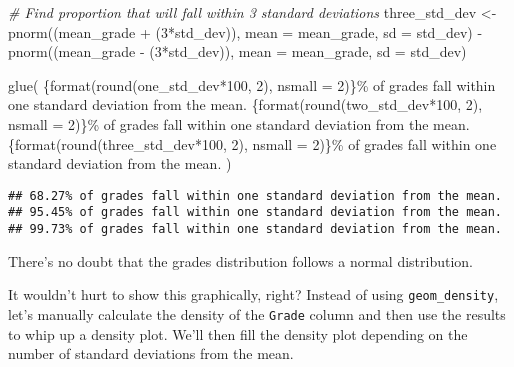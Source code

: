 \documentclass[
]{article}
\newenvironment{Shaded}{\begin{snugshade}}{\end{snugshade}}
\newcommand{\AttributeTok}[1]{\textcolor[rgb]{0.77,0.63,0.00}{#1}}
\newcommand{\CommentTok}[1]{\textcolor[rgb]{0.56,0.35,0.01}{\textit{#1}}}
\newcommand{\DecValTok}[1]{\textcolor[rgb]{0.00,0.00,0.81}{#1}}
\newcommand{\FunctionTok}[1]{\textcolor[rgb]{0.00,0.00,0.00}{#1}}
\newcommand{\NormalTok}[1]{#1}
\newcommand{\OtherTok}[1]{\textcolor[rgb]{0.56,0.35,0.01}{#1}}
\newcommand{\SpecialCharTok}[1]{\textcolor[rgb]{0.00,0.00,0.00}{#1}}
\newcommand{\StringTok}[1]{\textcolor[rgb]{0.31,0.60,0.02}{#1}}
\begin{document}
\begin{Shaded}
\begin{Highlighting}[]
\CommentTok{\# Find proportion that will fall within 3 standard deviations}
\NormalTok{three\_std\_dev }\OtherTok{\textless{}{-}} \FunctionTok{pnorm}\NormalTok{((mean\_grade }\SpecialCharTok{+}\NormalTok{ (}\DecValTok{3}\SpecialCharTok{*}\NormalTok{std\_dev)), }\AttributeTok{mean =}\NormalTok{ mean\_grade, }\AttributeTok{sd =}\NormalTok{ std\_dev) }\SpecialCharTok{{-}} 
  \FunctionTok{pnorm}\NormalTok{((mean\_grade }\SpecialCharTok{{-}}\NormalTok{ (}\DecValTok{3}\SpecialCharTok{*}\NormalTok{std\_dev)), }\AttributeTok{mean =}\NormalTok{ mean\_grade, }\AttributeTok{sd =}\NormalTok{ std\_dev)}

\FunctionTok{glue}\NormalTok{(}
  \StringTok{\textquotesingle{}}
\StringTok{  \{format(round(one\_std\_dev*100, 2), nsmall = 2)\}\% of grades fall within one standard deviation from the mean.}
\StringTok{  \{format(round(two\_std\_dev*100, 2), nsmall = 2)\}\% of grades fall within one standard deviation from the mean.}
\StringTok{  \{format(round(three\_std\_dev*100, 2), nsmall = 2)\}\% of grades fall within one standard deviation from the mean.}
\StringTok{  }
\StringTok{  \textquotesingle{}}
\NormalTok{)}
\end{Highlighting}
\end{Shaded}

\begin{verbatim}
## 68.27% of grades fall within one standard deviation from the mean.
## 95.45% of grades fall within one standard deviation from the mean.
## 99.73% of grades fall within one standard deviation from the mean.
\end{verbatim}

There's no doubt that the grades distribution follows a normal
distribution.

It wouldn't hurt to show this graphically, right? Instead of using
\texttt{geom\_density}, let's manually calculate the density of the
\texttt{Grade} column and then use the results to whip up a density
plot. We'll then fill the density plot depending on the number of
standard deviations from the mean.
\end{document}
